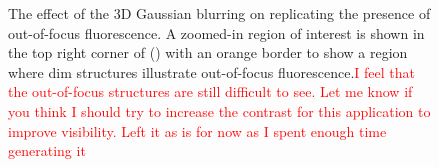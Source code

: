 \begin{figure}[h!]
    \centering
    \caption[The effect of the 3D Gaussian blurring on replicating the presence of out-of-focus fluorescence]{The effect of the 3D Gaussian blurring on replicating the presence of out-of-focus fluorescence. A zoomed-in region of interest is shown in the top right corner of () with an orange border to show a region where dim structures illustrate out-of-focus fluorescence.\textcolor{red}{I feel that the out-of-focus structures are still difficult to see. Let me know if you think I should try to increase the contrast for this application to improve visibility. Left it as is for now as I spent enough time generating it}}
    \label{fig:image_blurring_compare}
\end{figure}

